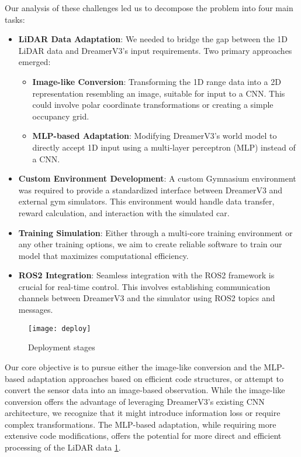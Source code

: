\newpage

Our analysis of these challenges led us to decompose the problem into four main tasks:
\begin{itemize}
    \item \textbf{LiDAR Data Adaptation}:  We needed to bridge the gap between the 1D LiDAR data and DreamerV3's input requirements.  Two primary approaches emerged:
    \begin{itemize}
        \item \textbf{Image-like Conversion}: Transforming the 1D range data into a 2D representation resembling an image, suitable for input to a CNN. This could involve polar coordinate transformations or creating a simple occupancy grid.
        \item \textbf{MLP-based Adaptation}: Modifying DreamerV3's world model to directly accept 1D input using a multi-layer perceptron (MLP) instead of a CNN.
    \end{itemize}
    \item \textbf{Custom Environment Development}:  A custom Gymnasium environment was required to provide a standardized interface between DreamerV3 and external gym simulators.  This environment would handle data transfer, reward calculation, and interaction with the simulated car.
    \item \textbf{Training Simulation}: Either through a multi-core training environment or any other training options, we aim to create reliable software to train our model that maximizes computational efficiency.
    \item \textbf{ROS2 Integration}:  Seamless integration with the ROS2 framework is crucial for real-time control. This involves establishing communication channels between DreamerV3 and the simulator using ROS2 topics and messages.
\end{itemize}

\begin{figure}
    \centering
    \texttt{[image: deploy]}
    \caption{Deployment stages}
    \label{fig:deploy}
\end{figure}

Our core objective is to pursue either the image-like conversion and the MLP-based adaptation approaches based on efficient code structures, or attempt to convert the sensor data into an image-based observation.  While the image-like conversion offers the advantage of leveraging DreamerV3's existing CNN architecture, we recognize that it might introduce information loss or require complex transformations. The MLP-based adaptation, while requiring more extensive code modifications, offers the potential for more direct and efficient processing of the LiDAR data \ref{fig:deploy}.


